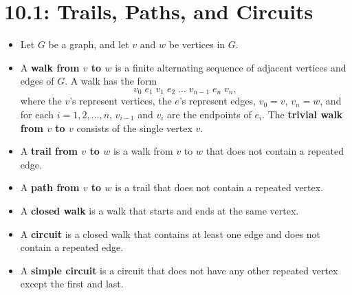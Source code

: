 \documentclass[../mathNotesPreamble]{subfiles}
\providecommand{\relscalefact}{1.4}
\begin{document}
\relscale{\relscalefact}
  \section{10.1: Trails, Paths, and Circuits}

  \begin{defn*}
    \begin{itemize}
      \item
        Let $G$ be a graph, and let $v$ and $w$ be vertices in $G$.

      \item
        A \textbf{walk from $v$ to $w$} is a finite alternating sequence of adjacent vertices and edges of $G$. A walk has the form
          \[v_0\; e_1\; v_1\; e_2\; \dots\; v_{n-1}\; e_n\; v_n,\]
        where the $v$'s represent vertices, the $e$'s represent edges, $v_0=v$, $v_n=w$, and for each $i=1,2,\dots, n$, $v_{i-1}$ and $v_i$ are the endpoints of $e_i$. The \textbf{trivial walk from $v$ to $v$} consists of the single vertex $v$.

      \item
        A \textbf{trail from $v$ to $w$} is a walk from $v$ to $w$ that does not contain a repeated edge.

      \item
        A \textbf{path from $v$ to $w$} is a trail that does not contain a repeated vertex.

      \item
        A \textbf{closed walk} is a walk that starts and ends at the same vertex.

      \item
        A \textbf{circuit} is a closed walk that contains at least one edge and does not contain a repeated edge.

      \item
        A \textbf{simple circuit} is a circuit that does not have any other repeated vertex except the first and last.
    \end{itemize}
  \end{defn*}
  \pagebreak
\end{document}
